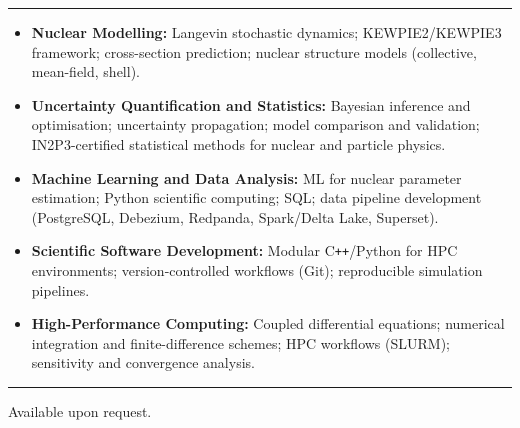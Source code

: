 \documentclass[10pt,a4paper]{article}
\newcommand{\cvsection}[1]{%
  \par\vspace{8pt}%
  \noindent{\large\bfseries\textcolor{maincolor}{#1}}\par
  {\color{maincolor}\rule{\linewidth}{0.6pt}}%
  \vspace{4pt}%
}
\begin{document}
\cvsection{Technical and Computational Skills}

{\footnotesize
\begin{itemize}[leftmargin=1.4em, itemsep=3pt, topsep=2pt,
                label=\textbullet]
  \item \textbf{Nuclear Modelling:} Langevin stochastic dynamics;
        KEWPIE2/KEWPIE3 framework; cross-section prediction; nuclear
        structure models (collective, mean-field, shell).
  \item \textbf{Uncertainty Quantification and Statistics:}
        Bayesian inference and optimisation; uncertainty
        propagation; model comparison and validation; IN2P3-certified
        statistical methods for nuclear and particle physics.
  \item \textbf{Machine Learning and Data Analysis:} ML for nuclear
        parameter estimation; Python scientific computing; SQL;
        data pipeline development (PostgreSQL, Debezium, Redpanda,
        Spark/Delta Lake, Superset).
  \item \textbf{Scientific Software Development:} Modular
        C\texttt{++}/Python for HPC environments; version-controlled
        workflows (Git); reproducible simulation pipelines.
  \item \textbf{High-Performance Computing:} Coupled differential
        equations; numerical integration and finite-difference schemes;
        HPC workflows (SLURM); sensitivity and convergence analysis.
\end{itemize}
}

\cvsection{Referees}
Available upon request.
\end{document}
